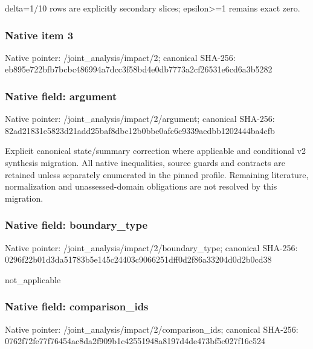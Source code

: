 \documentclass[10pt,a4paper]{article}
\begin{document}
\begingroup\raggedright\sloppy delta=\allowbreak{}1/\allowbreak{}10 rows are explicitly secondary slices;\allowbreak{} epsilon>=\allowbreak{}1 remains exact zero.\par\endgroup

\subsubsection{Native item 3}
Native pointer: /joint\_\allowbreak{}analysis/impact/2; canonical SHA-256: eb895e722bfb7bcbc486994a7dcc3f58bd4e0db7773a2cf26531e6cd6a3b5282

\subsubsection{Native field: argument}
Native pointer: /joint\_\allowbreak{}analysis/impact/2/argument; canonical SHA-256: 82ad21831e5823d21add25baf8dbc12b0bbe0afc6c9339aedbb1202444ba4cfb

\begingroup\raggedright\sloppy Explicit canonical state/\allowbreak{}summary correction where applicable and conditional v2 synthesis migration. All native inequalities,\allowbreak{} source guards and contracts are retained unless separately enumerated in the pinned profile. Remaining literature,\allowbreak{} normalization and unassessed-domain obligations are not resolved by this migration.\par\endgroup

\subsubsection{Native field: boundary\_\allowbreak{}type}
Native pointer: /joint\_\allowbreak{}analysis/impact/2/boundary\_\allowbreak{}type; canonical SHA-256: 0296f22b01d3da51783b5e145c24403c9066251dff0d2f86a33204d0d2b0cd38

\begingroup\raggedright\sloppy not\_\allowbreak{}applicable\par\endgroup

\subsubsection{Native field: comparison\_\allowbreak{}ids}
Native pointer: /joint\_\allowbreak{}analysis/impact/2/comparison\_\allowbreak{}ids; canonical SHA-256: 0762f72fe77f76454ac8da2f909b1c42551948a8197d4de473bf5c027f16c524
\end{document}
